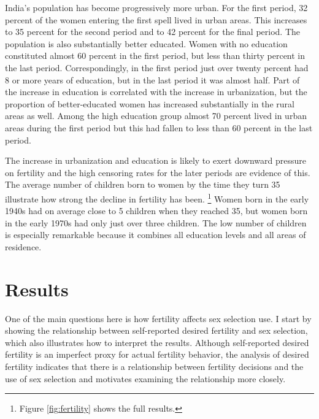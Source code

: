 \documentclass[12pt,letterpaper]{article}
\begin{document}
India's population has become progressively more urban.
For the first period, 32 percent of the women entering the first spell lived in urban areas.
This increases to 35 percent for the second period and to 42 percent for the final period.
The population is also substantially better educated.
Women with no education constituted almost 60 percent 
in the first period, but less than thirty percent in the last period.
Correspondingly, in the first period just over twenty percent had 8 or more 
years of education, but in the last period it was almost half.
Part of the increase in education is correlated with the increase in urbanization,
but the proportion of better-educated women has increased substantially
in the rural areas as well.
Among the high education group almost 70 percent lived in urban areas
during the first period but this had fallen to less than 60 percent
in the last period.

The increase in urbanization and education is likely to exert downward pressure
on fertility and the high censoring rates for the later periods are evidence of this.
The average number of children born to women by the time they turn 35 illustrate how
strong the decline in fertility has been.%
\footnote{
Figure \ref{fig:fertility} shows the full results.
}
Women born in the early 1940s had on average close to 5 children when 
they reached 35, but women born in the early 1970s had only just over three children.
The low number of children is especially remarkable because it combines
all education levels and all areas of residence.


\section{Results\label{sec:results}}

One of the main questions here is how fertility affects sex selection use.
I start by showing the relationship between self-reported desired fertility and sex 
selection, which also illustrates how to interpret the results.
Although self-reported desired fertility is an imperfect proxy for actual
fertility behavior, the analysis of desired fertility indicates that there is 
a relationship between fertility decisions and the use of sex selection and motivates 
examining the relationship more closely.
\end{document}
